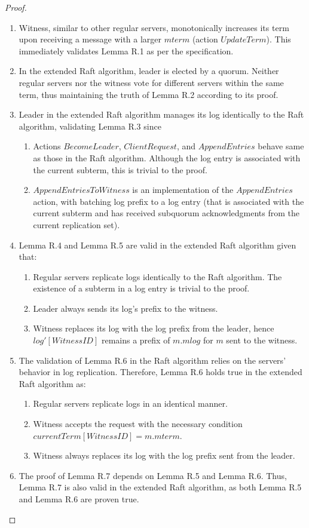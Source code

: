 \begin{proof}
	\begin{enumerate}
		\item Witness, similar to other regular servers, monotonically increases its term upon receiving a message with a larger $mterm$ (action $UpdateTerm$). This immediately validates Lemma R.1 as per the specification.
		\item In the extended Raft algorithm, leader is elected by a quorum. Neither regular servers nor the witness vote for different servers within the same term, thus maintaining the truth of Lemma R.2 according to its proof.
		\item Leader in the extended Raft algorithm manages its log identically to the Raft algorithm, validating Lemma R.3 since
		\begin{enumerate}
			\item Actions $BecomeLeader$, $ClientRequest$, and $AppendEntries$ behave same as those in the Raft algorithm. Although the log entry is associated with the current subterm, this is trivial to the proof.
			\item $AppendEntriesToWitness$ is an implementation of the $AppendEntries$ action, with batching log prefix to a log entry (that is associated with the current subterm and has received subquorum acknowledgments from the current replication set).
		\end{enumerate}
		\item Lemma R.4 and Lemma R.5 are valid in the extended Raft algorithm given that:
		\begin{enumerate}
			\item Regular servers replicate logs identically to the Raft algorithm. The existence of a subterm in a log entry is trivial to the proof.
			\item Leader always sends its log's prefix to the witness.
			\item Witness replaces its log with the log prefix from the leader, hence $log'[WitnessID]$ remains a prefix of $m.mlog$ for $m$ sent to the witness.
		\end{enumerate}
		\item The validation of Lemma R.6 in the Raft algorithm relies on the servers' behavior in log replication. Therefore, Lemma R.6 holds true in the extended Raft algorithm as:
		\begin{enumerate}
			\item Regular servers replicate logs in an identical manner.
			\item Witness accepts the request with the necessary condition $currentTerm[WitnessID]=m.mterm$.
			\item Witness always replaces its log with the log prefix sent from the leader.
		\end{enumerate}
		\item The proof of Lemma R.7 depends on Lemma R.5 and Lemma R.6. Thus, Lemma R.7 is also valid in the extended Raft algorithm, as both Lemma R.5 and Lemma R.6 are proven true.
	\end{enumerate}
\end{proof}

